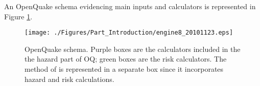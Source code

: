 An OpenQuake schema evidencing main inputs and calculators is represented in 
Figure \ref{fig:openquake_schema}.
\begin{figure}
\texttt{[image: ./Figures/Part\_Introduction/engine8\_20101123.eps]}
\caption{OpenQuake schema. Purple boxes are the calculators included in the  
the hazard part of OQ; green boxes are the risk calculators. The method of 
\citet{wesson2009} is represented in a separate box since it incorporates 
hazard and risk calculations.}
\label{fig:openquake_schema}
\end{figure}
